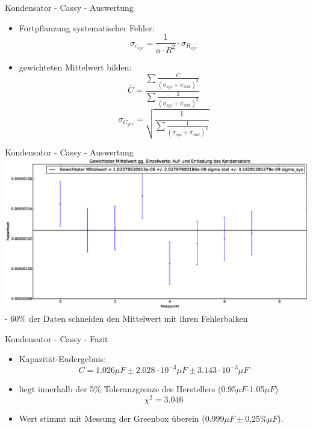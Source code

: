 \documentclass[11pt]{beamer}
\begin{document}
\begin{frame}{Kondensator - Cassy - Auswertung}
\begin{itemize}
\item Fortpflanzung systematischer Fehler:
\begin{equation}
\sigma_{c_{sys}} = \frac{1}{a\cdot R^2}\cdot\sigma_{R_{sys}}
\end{equation}
\item gewichteten Mittelwert bilden:
\begin{equation}
\bar{C} = \frac{\sum{\frac{C}{(\sigma_{sys}+\sigma_{stat})^2}}}{\sum{\frac{1}{(\sigma_{sys}+\sigma_{stat})^2}}}
\end{equation}
\begin{equation}
\sigma_{C_{ges}} = \sqrt{\frac{1}{\sum{\frac{1}{(\sigma_{sys}+\sigma_{stat})^2}}}}
\end{equation}
\end{itemize}
\end{frame}

\begin{frame}{Kondensator - Cassy - Auswertung}
\includegraphics[scale=0.2]{verteilung_mean.eps}\\
- 60\% der Daten schneiden den Mittelwert mit ihren Fehlerbalken
\end{frame}

\begin{frame}{Kondensator - Cassy - Fazit}
\begin{itemize}
\item Kapazität-Endergebnis:
\begin{equation}
C = 1.026\mu F \pm 2.028\cdot 10^{-3}\mu F \pm 3.143\cdot 10^{-3}\mu F
\end{equation}
\item liegt innerhalb der 5\% Toleranzgrenze des Herstellers (0.95$\mu F$-1.05$\mu F$)
\begin{equation} \chi^2 = 3.046 
\end{equation} 
\item Wert stimmt mit Messung der Greenbox überein (0.999$\mu F \pm$0,25\%$\mu F$).

\end{itemize}
\end{frame}
\end{document}
